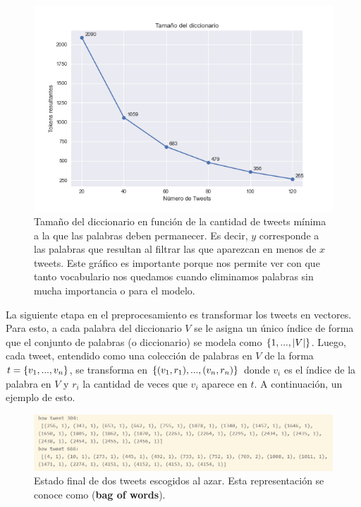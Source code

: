 \documentclass{article}
\begin{document}
	\begin{figure}[H]
		\centering
		\includegraphics[scale=.4]{../imgs/no_below_len_dict.png}
		\caption{Tamaño del diccionario en función de la cantidad de tweets mínima a la que las palabras deben permanecer. Es decir, $y$ corresponde a las palabras que resultan al filtrar las que aparezcan en menos de $x$ tweets. Este gráfico es importante porque nos permite ver con que tanto vocabulario nos quedamos cuando eliminamos palabras sin mucha importancia o para el modelo.}
	\end{figure}

	

	La siguiente etapa en el preprocesamiento es transformar los tweets en vectores. Para esto, a cada palabra del diccionario $V$ se le asigna un único índice de forma que el conjunto de palabras (o diccionario) se modela como $\left\{1,...,|V|\right\}$. Luego, cada tweet, entendido como una colección de palabras en $V$ de la forma $t=\left\{v_1,...,v_n\right\}$, se transforma en $\left\{(v_1,r_1),...,(v_n,r_n)\right\}$ donde $v_i$ es el índice de la palabra en $V$ y $r_i$ la cantidad de veces que $v_i$ aparece en $t$. A continuación, un ejemplo de esto.
	
	\begin{figure}[H]
		\centering
		\includegraphics[scale=.5]{../imgs/bow_tweet_informe.png}
		\caption{Estado final de dos tweets escogidos al azar. Esta representación se conoce como  (\textbf{bag of words}).}
		\label{fig: bow_example}
	\end{figure}
	
\end{document}

